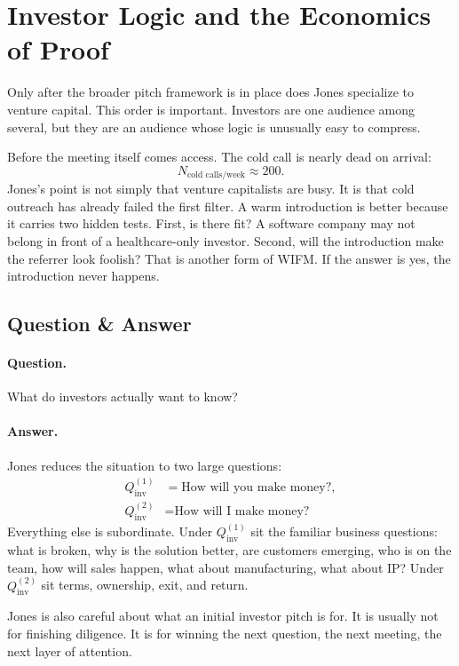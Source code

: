 \section{Investor Logic and the Economics of Proof}

Only after the broader pitch framework is in place does Jones specialize to venture capital. This order is important. Investors are one audience among several, but they are an audience whose logic is unusually easy to compress.

Before the meeting itself comes access. The cold call is nearly dead on arrival:
\begin{equation}
N_{\text{cold calls/week}} \approx 200.
\end{equation}
Jones's point is not simply that venture capitalists are busy. It is that cold outreach has already failed the first filter. A warm introduction is better because it carries two hidden tests. First, is there fit? A software company may not belong in front of a healthcare-only investor. Second, will the introduction make the referrer look foolish? That is another form of WIFM. If the answer is yes, the introduction never happens.

\subsection{Question \& Answer}

\paragraph{Question.} What do investors actually want to know?

\paragraph{Answer.} Jones reduces the situation to two large questions:
\begin{align}
Q_{\text{inv}}^{(1)} &= \text{How will you make money?},\\
Q_{\text{inv}}^{(2)} &= \text{How will I make money?}
\end{align}
Everything else is subordinate. Under \(Q_{\text{inv}}^{(1)}\) sit the familiar business questions: what is broken, why is the solution better, are customers emerging, who is on the team, how will sales happen, what about manufacturing, what about IP? Under \(Q_{\text{inv}}^{(2)}\) sit terms, ownership, exit, and return.

Jones is also careful about what an initial investor pitch is for. It is usually not for finishing diligence. It is for winning the next question, the next meeting, the next layer of attention.

